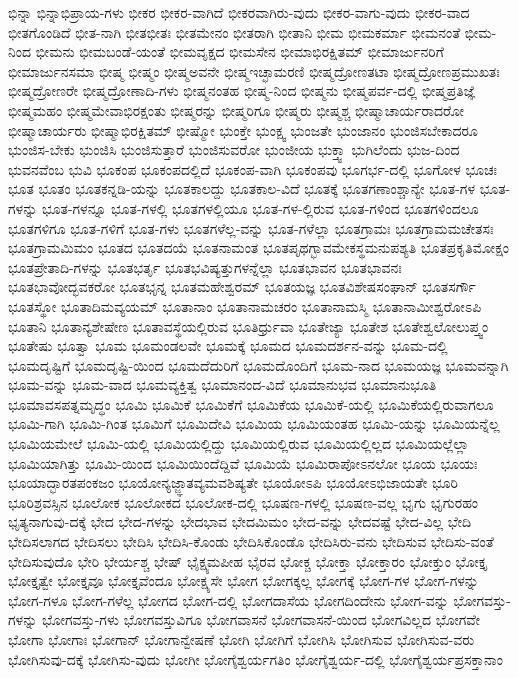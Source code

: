 {ಭಿನ್ನಾ
ಭಿನ್ನಾಭಿಪ್ರಾಯ-ಗಳು
ಭೀಕರ
ಭೀಕರ-ವಾಗಿದೆ
ಭೀಕರವಾಗಿರು-ವುದು
ಭೀಕರ-ವಾಗು-ವುದು
ಭೀಕರ-ವಾದ
ಭೀತಗೊಂಡಿದೆ
ಭೀತ-ನಾಗಿ
ಭೀತಭೀತಃ
ಭೀತಮೇನಂ
ಭೀತರಾಗಿ
ಭೀತಾನಿ
ಭೀಮ
ಭೀಮಕರ್ಮಾ
ಭೀಮನಂತೆ
ಭೀಮ-ನಿಂದ
ಭೀಮನು
ಭೀಮಬಂಡೆ-ಯಂತೆ
ಭೀಮವೃಕ್ಷದ
ಭೀಮಸೇನ
ಭೀಮಾಭಿರಕ್ಷಿತಮ್
ಭೀಮಾರ್ಜುನರಿಗೆ
ಭೀಮಾರ್ಜುನಸಮಾ
ಭೀಷ್ಮ
ಭೀಷ್ಮಂ
ಭೀಷ್ಮಅವನೇ
ಭೀಷ್ಮಇಚ್ಛಾಮರಣಿ
ಭೀಷ್ಮದ್ರೋಣತಟಾ
ಭೀಷ್ಮದ್ರೋಣಪ್ರಮುಖತಃ
ಭೀಷ್ಮದ್ರೋಣರೇ
ಭೀಷ್ಮದ್ರೋಣಾದಿ-ಗಳು
ಭೀಷ್ಮನಂತಹ
ಭೀಷ್ಮ-ನಿಂದ
ಭೀಷ್ಮನು
ಭೀಷ್ಮಪರ್ವ-ದಲ್ಲಿ
ಭೀಷ್ಮಪ್ರತಿಜ್ಞೆ
ಭೀಷ್ಮಮಹಂ
ಭೀಷ್ಮಮೇವಾಭಿರಕ್ಷಂತು
ಭೀಷ್ಮರನ್ನು
ಭೀಷ್ಮರಿಗೂ
ಭೀಷ್ಮರು
ಭೀಷ್ಮಶ್ಚ
ಭೀಷ್ಮಾಚಾರ್ಯರಾದರೋ
ಭೀಷ್ಮಾಚಾರ್ಯರು
ಭೀಷ್ಮಾಭಿರಕ್ಷಿತಮ್
ಭೀಷ್ಮೋ
ಭುಂಕ್ತೇ
ಭುಂಕ್ಷ್ವ
ಭುಂಜತೇ
ಭುಂಜಾನಂ
ಭುಂಜಿಸಬೇಕಾದರೂ
ಭುಂಜಿಸ-ಬೇಕು
ಭುಂಜಿಸಿ
ಭುಂಜಿಸುತ್ತಾರೆ
ಭುಂಜಿಸುವರೋ
ಭುಂಜೀಯ
ಭುಕ್ತ್ವಾ
ಭುಗಿಲೆಂದು
ಭುಜ-ದಿಂದ
ಭುವನವೆಂಬ
ಭುವಿ
ಭೂಕಂಪ
ಭೂಕಂಪದಲ್ಲಿದೆ
ಭೂಕಂಪ-ವಾಗಿ
ಭೂಕಂಪವು
ಭೂಗರ್ಭ-ದಲ್ಲಿ
ಭೂಗೋಳ
ಭೂಚಃ
ಭೂತ
ಭೂತಂ
ಭೂತಕನ್ನಡಿ-ಯನ್ನು
ಭೂತಕಾಲದ್ದು
ಭೂತಕಾಲ-ವಿದೆ
ಭೂತಕ್ಕೆ
ಭೂತಗಣಾಂಶ್ಚಾನ್ಯೇ
ಭೂತ-ಗಳ
ಭೂತ-ಗಳನ್ನು
ಭೂತ-ಗಳನ್ನೂ
ಭೂತ-ಗಳಲ್ಲಿ
ಭೂತಗಳಲ್ಲಿಯೂ
ಭೂತ-ಗಳ-ಲ್ಲಿರುವ
ಭೂತ-ಗಳಿಂದ
ಭೂತಗಳಿಂದಲೂ
ಭೂತಗಳಿಗೂ
ಭೂತ-ಗಳಿಗೆ
ಭೂತ-ಗಳು
ಭೂತಗಳೆಲ್ಲ-ವನ್ನು
ಭೂತ-ಗಳೆಲ್ಲಾ
ಭೂತಗ್ರಾಮಃ
ಭೂತಗ್ರಾಮಮಚೇತಸಃ
ಭೂತಗ್ರಾಮಮಿಮಂ
ಭೂತದ
ಭೂತದಯೆ
ಭೂತನಾಮಂತ
ಭೂತಪೃಥಗ್ಭಾವಮೇಕಸ್ಥಮನುಪಶ್ಯತಿ
ಭೂತಪ್ರಕೃತಿಮೋಕ್ಷಂ
ಭೂತಪ್ರೇತಾದಿ-ಗಳನ್ನು
ಭೂತಭರ್ತೃ
ಭೂತಭವಿಷ್ಯತ್ತುಗಳನ್ನೆಲ್ಲಾ
ಭೂತಭಾವನ
ಭೂತಭಾವನಃ
ಭೂತಭಾವೋದ್ಭವಕರೋ
ಭೂತಭೃನ್ನ
ಭೂತಮಹೇಶ್ವರಮ್
ಭೂತಯಜ್ಞ
ಭೂತವಿಶೇಷಸಂಘಾನ್
ಭೂತಸರ್ಗೌ
ಭೂತಸ್ಥೋ
ಭೂತಾದಿಮವ್ಯಯಮ್
ಭೂತಾನಾಂ
ಭೂತಾನಾಮಚರಂ
ಭೂತಾನಾಮಸ್ಮಿ
ಭೂತಾನಾಮೀಶ್ವರೋಽಪಿ
ಭೂತಾನಿ
ಭೂತಾನ್ಯಶೇಷೇಣ
ಭೂತಾವಸ್ಥೆಯಲ್ಲಿರುವ
ಭೂತಿರ್ಧ್ರುವಾ
ಭೂತೇಜ್ಯಾ
ಭೂತೇಶ
ಭೂತೇಶ್ವಲೋಲುಪ್ತ್ವಂ
ಭೂತೇಷು
ಭೂತ್ವಾ
ಭೂಮ
ಭೂಮಂಡಲವೇ
ಭೂಮಕ್ಕೆ
ಭೂಮದ
ಭೂಮದರ್ಶನ-ವನ್ನು
ಭೂಮ-ದಲ್ಲಿ
ಭೂಮದೃಷ್ಟಿಗೆ
ಭೂಮದೃಷ್ಟಿ-ಯಿಂದ
ಭೂಮದೆದುರಿಗೆ
ಭೂಮದೊಂದಿಗೆ
ಭೂಮ-ನಾದ
ಭೂಮಯಜ್ಞ
ಭೂಮವನ್ನಾಗಿ
ಭೂಮ-ವನ್ನು
ಭೂಮ-ವಾದ
ಭೂಮವ್ಯಕ್ತಿತ್ವ
ಭೂಮಾನಂದ-ವಿದೆ
ಭೂಮಾನುಭವ
ಭೂಮಾನುಭೂತಿ
ಭೂಮಾವಸಪತ್ನಮೃದ್ಧಂ
ಭೂಮಿ
ಭೂಮಿಕೆ
ಭೂಮಿಕೆಗೆ
ಭೂಮಿಕೆಯ
ಭೂಮಿಕೆ-ಯಲ್ಲಿ
ಭೂಮಿಕೆಯಲ್ಲಿರುವಾಗಲೂ
ಭೂಮಿ-ಗಾಗಿ
ಭೂಮಿ-ಗಿಂತ
ಭೂಮಿಗೆ
ಭೂಮಿದೇವಿ
ಭೂಮಿಯ
ಭೂಮಿಯಂತಹ
ಭೂಮಿ-ಯನ್ನು
ಭೂಮಿಯನ್ನೆಲ್ಲ
ಭೂಮಿಯಮೇಲೆ
ಭೂಮಿ-ಯಲ್ಲಿ
ಭೂಮಿಯಲ್ಲಿದ್ದು
ಭೂಮಿಯಲ್ಲಿರುವ
ಭೂಮಿಯಲ್ಲಿಲ್ಲದ
ಭೂಮಿಯಲ್ಲೆಲ್ಲಾ
ಭೂಮಿಯಾಗಿತ್ತು
ಭೂಮಿ-ಯಿಂದ
ಭೂಮಿಯಿಂದೆದ್ದಿವೆ
ಭೂಮಿಯೆ
ಭೂಮಿರಾಪೋಽನಲೋ
ಭೂಯ
ಭೂಯಃ
ಭೂಯಾದ್ಭಾರತಪಂಕಜಂ
ಭೂಯೋನ್ಯಜ್ಜ್ಞಾತವ್ಯಮವಶಿಷ್ಯತೇ
ಭೂಯೋಽಪಿ
ಭೂಯೋಽಭಿಜಾಯತೇ
ಭೂರಿ
ಭೂರಿಶ್ರವಸ್ಸಿನ
ಭೂಲೋಕ
ಭೂಲೋಕದ
ಭೂಲೋಕ-ದಲ್ಲಿ
ಭೂಷಣ-ಗಳಲ್ಲಿ
ಭೂಷಣ-ವಲ್ಲ
ಭೃಗು
ಭೃಗುರಹಂ
ಭೃತ್ಯನಾಗುವು-ದಕ್ಕೆ
ಭೇದ
ಭೇದ-ಗಳನ್ನು
ಭೇದಭಾವ
ಭೇದಮಿಮಂ
ಭೇದ-ವನ್ನು
ಭೇದವಷ್ಟೆ
ಭೇದ-ವಿಲ್ಲ
ಭೇದಿ
ಭೇದಿಸಲಾಗದ
ಭೇದಿಸಲು
ಭೇದಿಸಿ
ಭೇದಿಸಿ-ಕೊಂಡು
ಭೇದಿಸಿಕೊಂಡೊ
ಭೇದಿಸಿರು-ವನು
ಭೇದಿಸುವ
ಭೇದಿಸು-ವಂತೆ
ಭೇದಿಸುವುದೊ
ಭೇರಿ
ಭೇರ್ಯಶ್ಚ
ಭೇಷ್
ಭೈಕ್ಷ್ಯಮಪೀಹ
ಭೈರವ
ಭೋಕ್ಚ
ಭೋಕ್ತಾ
ಭೋಕ್ತಾರಂ
ಭೋಕ್ತುಂ
ಭೋಕ್ತೃ
ಭೋಕ್ತೃತ್ವೇ
ಭೋಕ್ತೃವೂ
ಭೋಕ್ತೃವೆಂದೂ
ಭೋಕ್ಷ್ಯಸೇ
ಭೋಗ
ಭೋಗಕ್ಕಲ್ಲ
ಭೋಗಕ್ಕೆ
ಭೋಗ-ಗಳ
ಭೋಗ-ಗಳನ್ನು
ಭೋಗ-ಗಳೂ
ಭೋಗ-ಗಳೆಲ್ಲ
ಭೋಗದ
ಭೋಗ-ದಲ್ಲಿ
ಭೋಗದಾಸೆಯ
ಭೋಗದಿಂದೇನು
ಭೋಗ-ವನ್ನು
ಭೋಗವಸ್ತು-ಗಳನ್ನು
ಭೋಗವಸ್ತು-ಗಳು
ಭೋಗವಸ್ತುವಿಗೂ
ಭೋಗವಾಸನೆ
ಭೋಗವಾಸನೆ-ಯಿಂದ
ಭೋಗವಿಲ್ಲದ
ಭೋಗವೇ
ಭೋಗಾ
ಭೋಗಾಃ
ಭೋಗಾನ್
ಭೋಗಾನ್ವೇಷಣೆ
ಭೋಗಿ
ಭೋಗಿಗೆ
ಭೋಗಿಸಿ
ಭೋಗಿಸುವ
ಭೋಗಿಸುವ-ವರು
ಭೋಗಿಸುವು-ದಕ್ಕೆ
ಭೋಗಿಸು-ವುದು
ಭೋಗೀ
ಭೋಗೈಶ್ವರ್ಯಗತಿಂ
ಭೋಗೈಶ್ವರ್ಯ-ದಲ್ಲಿ
ಭೋಗೈಶ್ವರ್ಯಪ್ರಸಕ್ತಾನಾಂ
}
